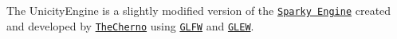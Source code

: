 The Unicity\+Engine is a slightly modified version of the \href{https://github.com/TheCherno/Sparky}{\tt Sparky Engine} created and developed by \href{https://github.com/TheCherno}{\tt The\+Cherno} using \href{http://www.glfw.org/}{\tt G\+L\+F\+W} and \href{http://glew.sourceforge.net/}{\tt G\+L\+E\+W}. 